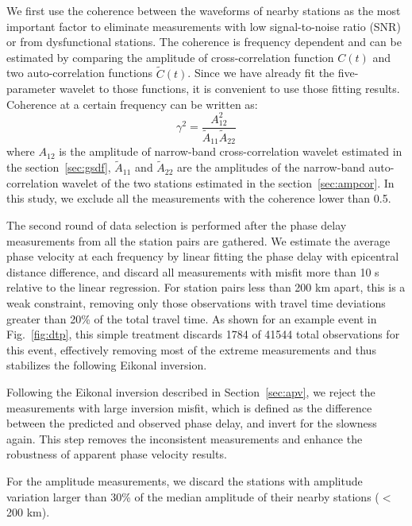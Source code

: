 We first use the coherence between the waveforms of nearby stations as the most important factor to eliminate measurements with low signal-to-noise ratio (SNR) or from dysfunctional stations. The coherence is frequency dependent and can be estimated by comparing the amplitude of cross-correlation function $C(t)$ and two auto-correlation functions $\tilde{C}(t)$. Since we have already fit the five-parameter wavelet to those functions, it is convenient to use those fitting results. Coherence at a certain frequency can be written as:
\begin{equation}
\gamma^2 = \frac{A_{12}^2}{\tilde{A}_{11}\tilde{A}_{22}}
\end{equation}
where $A_{12}$ is the amplitude of narrow-band cross-correlation wavelet estimated in the section~\ref{sec:gsdf}, $\tilde{A}_{11}$  and $\tilde{A}_{22}$ are the amplitudes of the narrow-band auto-correlation wavelet of the two stations estimated in the section~\ref{sec:ampcor}. In this study, we exclude all the measurements with the coherence lower than 0.5.

The second round of data selection is performed after the phase delay measurements from all the station pairs are gathered. We estimate the average phase velocity at each frequency by linear fitting the phase delay with epicentral distance difference, and discard all measurements with misfit more than 10 s relative to the linear regression. For station pairs less than 200 km apart, this is a weak constraint, removing only those observations with travel time deviations greater than 20\% of the total travel time. As shown for an example event in Fig.~\ref{fig:dtp}, this simple treatment discards 1784 of 41544 total observations for this event, effectively removing most of the extreme measurements and thus stabilizes the following Eikonal inversion.

Following the Eikonal inversion described in Section~\ref{sec:apv}, we reject the measurements with large inversion misfit, which is defined as the difference between the predicted and observed phase delay, and invert for the slowness again. This step removes the inconsistent measurements and enhance the robustness of apparent phase velocity results. 

For the amplitude measurements, we discard the stations with amplitude variation larger than 30\% of the median amplitude of their nearby stations ($<$200 km).   




